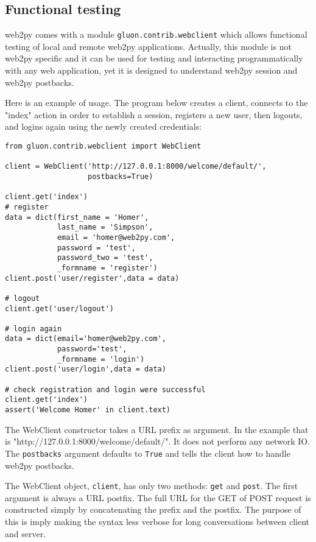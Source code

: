 \documentclass[justified,sixbynine,notoc]{tufte-book}
\def\ft{\small\tt}
\begin{document}
\begin{fullwidth}
\goodbreak\section{Functional testing}
\noindent web2py comes with a module {\ft gluon.contrib.webclient} which allows functional testing of local and remote web2py applications. Actually, this module is not web2py specific and it can be used for testing and interacting programmatically with any web application, yet it is designed to understand web2py session and web2py postbacks.

Here is an example of usage. The program below creates a client,
connects to the "index" action in order to establish a session,
registers a new user, then logouts, and logins again using the
newly created credentials:

\begin{lstlisting}
from gluon.contrib.webclient import WebClient

client = WebClient('http://127.0.0.1:8000/welcome/default/',
                   postbacks=True)

client.get('index')
# register
data = dict(first_name = 'Homer',
            last_name = 'Simpson',
            email = 'homer@web2py.com',
            password = 'test',
            password_two = 'test',
            _formname = 'register')
client.post('user/register',data = data)

# logout
client.get('user/logout')

# login again
data = dict(email='homer@web2py.com',
            password='test',
            _formname = 'login')
client.post('user/login',data = data)

# check registration and login were successful
client.get('index')
assert('Welcome Homer' in client.text)
\end{lstlisting}

The WebClient constructor takes a URL prefix as argument. In the example that is "http://127.0.0.1:8000/welcome/default/". It does not perform any network IO. The {\ft postbacks} argument defaults to {\ft True} and tells the client how to handle web2py postbacks.

The WebClient object, {\ft client}, has only two methods:
{\ft get} and {\ft post}.  The first argument is always a URL postfix.
The full URL for the GET of POST request is constructed simply by concatenating the prefix and the postfix. The purpose of this is imply making the syntax less verbose for long conversations between client and server.


\end{fullwidth}
\end{document}
